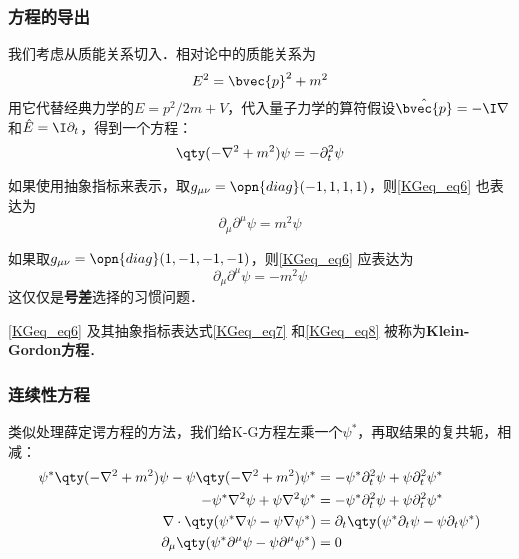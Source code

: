 \subsubsection{方程的导出}

我们考虑从质能关系切入．相对论中的质能关系为
\begin{equation}
E^2=\bvec{p}^2+m^2
\end{equation}
用它代替经典力学的$E=p^2/2m+V$，代入量子力学的算符假设$\hat{\bvec{p}}=-\I\nabla$和$\hat{E}=\I\partial_t$，得到一个方程：
\begin{equation}\label{KGeq_eq6}
\qty(-\nabla^2+m^2)\psi = -\partial_t^2 \psi
\end{equation}

如果使用抽象指标来表示，取$g_{\mu\nu}=\opn{diag}(-1, 1, 1, 1)$，则\autoref{KGeq_eq6} 也表达为
\begin{equation}\label{KGeq_eq7}
\partial_\mu\partial^\mu \psi = m^2\psi
\end{equation}

如果取$g_{\mu\nu}=\opn{diag}(1, -1, -1, -1)$，则\autoref{KGeq_eq6} 应表达为
\begin{equation}\label{KGeq_eq8}
\partial_\mu\partial^\mu \psi = -m^2\psi
\end{equation}
这仅仅是\textbf{号差}选择的习惯问题．

\autoref{KGeq_eq6} 及其抽象指标表达式\autoref{KGeq_eq7} 和\autoref{KGeq_eq8} 被称为\textbf{Klein-Gordon方程}．



\subsubsection{连续性方程}

类似处理薛定谔方程的方法，我们给K-G方程左乘一个$\psi^*$，再取结果的复共轭，相减：
\begin{equation}\label{KGeq_eq9}
\begin{aligned}
\psi^*\qty(-\nabla^2+m^2)\psi-\psi\qty(-\nabla^2+m^2)\psi^* &= -\psi^*\partial_t^2 \psi+\psi\partial_t^2 \psi^*\\
-\psi^*\nabla^2\psi+\psi\nabla^2\psi^* &= -\psi^*\partial_t^2\psi+\psi\partial_t^2\psi^*\\
\nabla\cdot\qty(\psi^*\nabla\psi-\psi\nabla\psi^*) &= \partial_t\qty(\psi^*\partial_t\psi-\psi\partial_t\psi^*)\\
\partial_\mu\qty(\psi^*\partial^\mu\psi-\psi\partial^\mu\psi^*) & =0
\end{aligned}
\end{equation}


